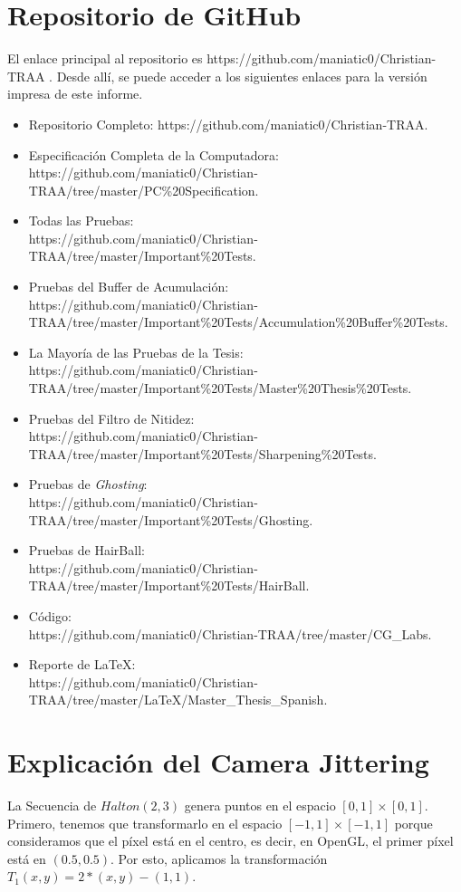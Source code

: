\documentclass[pregrado]{tesis-usb} %
\begin{document}
\chapter{Repositorio de GitHub}
El enlace principal al repositorio es https://github.com/maniatic0/Christian-TRAA . Desde allí, se puede acceder a los siguientes enlaces para la versión impresa de este informe.
\begin{itemize}
	\item Repositorio Completo: https://github.com/maniatic0/Christian-TRAA.
	\item Especificación Completa de la Computadora: \\ https://github.com/maniatic0/Christian-TRAA/tree/master/PC\%20Specification.
	\item Todas las Pruebas: \\ https://github.com/maniatic0/Christian-TRAA/tree/master/Important\%20Tests.
	\item Pruebas del Buffer de Acumulación: \\ https://github.com/maniatic0/Christian-TRAA/tree/master/Important\%20Tests/Accumulation\%20Buffer\%20Tests.
	\item La Mayoría de las Pruebas de la Tesis: \\ https://github.com/maniatic0/Christian-TRAA/tree/master/Important\%20Tests/Master\%20Thesis\%20Tests.
	\item Pruebas del Filtro de Nitidez: \\ https://github.com/maniatic0/Christian-TRAA/tree/master/Important\%20Tests/Sharpening\%20Tests.
	\item Pruebas de \textit{Ghosting}: \\ https://github.com/maniatic0/Christian-TRAA/tree/master/Important\%20Tests/Ghosting.
	\item Pruebas de HairBall: \\ https://github.com/maniatic0/Christian-TRAA/tree/master/Important\%20Tests/HairBall.
	\item Código: \\ https://github.com/maniatic0/Christian-TRAA/tree/master/CG\_Labs.
	\item Reporte de \LaTeX: \\ https://github.com/maniatic0/Christian-TRAA/tree/master/LaTeX/Master\_Thesis\_Spanish.
\end{itemize}
\chapter{Explicación del Camera Jittering} \label{appendix:jitter}
La Secuencia de $Halton(2, 3)$ genera puntos en el espacio $[0,1] \times [0,1]$. Primero, tenemos que transformarlo en el espacio $[- 1,1] \times [-1,1]$ porque consideramos que el píxel está en el centro, es decir, en OpenGL, el primer píxel está en $(0.5, 0.5)$. Por esto, aplicamos la transformación $T_1 (x, y) = 2 * (x, y) - (1, 1)$.
\end{document}
